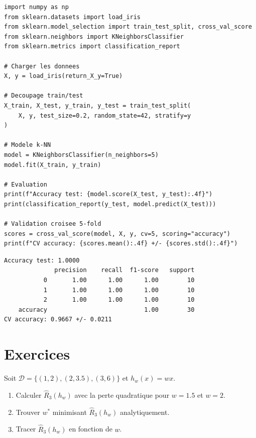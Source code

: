 \begin{codeblock}[title=\textbf{Classification Iris avec scikit-learn}]
\begin{verbatim}
import numpy as np
from sklearn.datasets import load_iris
from sklearn.model_selection import train_test_split, cross_val_score
from sklearn.neighbors import KNeighborsClassifier
from sklearn.metrics import classification_report

# Charger les donnees
X, y = load_iris(return_X_y=True)

# Decoupage train/test
X_train, X_test, y_train, y_test = train_test_split(
    X, y, test_size=0.2, random_state=42, stratify=y
)

# Modele k-NN
model = KNeighborsClassifier(n_neighbors=5)
model.fit(X_train, y_train)

# Evaluation
print(f"Accuracy test: {model.score(X_test, y_test):.4f}")
print(classification_report(y_test, model.predict(X_test)))

# Validation croisee 5-fold
scores = cross_val_score(model, X, y, cv=5, scoring="accuracy")
print(f"CV accuracy: {scores.mean():.4f} +/- {scores.std():.4f}")
\end{verbatim}
\end{codeblock}

\begin{codeoutput}
\begin{verbatim}
Accuracy test: 1.0000
              precision    recall  f1-score   support
           0       1.00      1.00      1.00        10
           1       1.00      1.00      1.00        10
           2       1.00      1.00      1.00        10
    accuracy                           1.00        30
CV accuracy: 0.9667 +/- 0.0211
\end{verbatim}
\end{codeoutput}

\section{Exercices}
\label{sec:exercises-ch1}

\begin{exercice}
Soit $\mathcal{D} = \{(1, 2), (2, 3.5), (3, 6)\}$ et $h_w(x) = wx$.
\begin{enumerate}
  \item Calculer $\hat{R}_3(h_w)$ avec la perte quadratique pour $w = 1.5$
    et $w = 2$.
  \item Trouver $w^*$ minimisant $\hat{R}_3(h_w)$ analytiquement.
  \item Tracer $\hat{R}_3(h_w)$ en fonction de $w$.
\end{enumerate}
\end{exercice}

